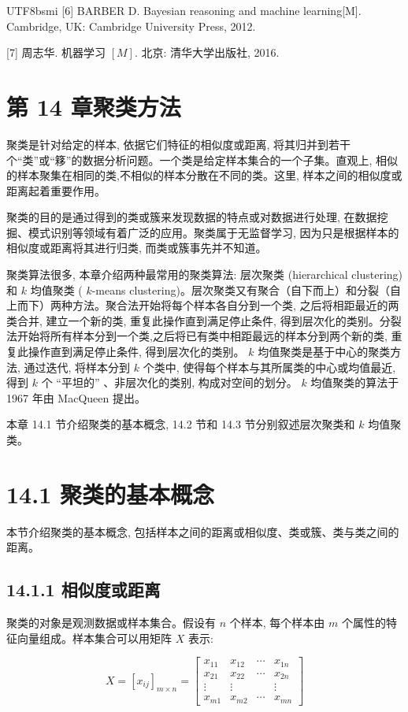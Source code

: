 \documentclass[10pt]{article}
\begin{document}
\begin{CJK*}{UTF8}{bsmi}
[6] BARBER D. Bayesian reasoning and machine learning[M]. Cambridge, UK: Cambridge University Press, 2012.

[7] 周志华. 机器学习 $[M]$. 北京: 清华大学出版社, 2016.

\section*{第 14 章聚类方法}
聚类是针对给定的样本, 依据它们特征的相似度或距离, 将其归并到若干个“类”或“簃”的数据分析问题。一个类是给定样本集合的一个子集。直观上, 相似的样本聚集在相同的类,不相似的样本分散在不同的类。这里, 样本之间的相似度或距离起着重要作用。

聚类的目的是通过得到的类或簇来发现数据的特点或对数据进行处理, 在数据挖掘、模式识别等领域有着广泛的应用。聚类属于无监督学习, 因为只是根据样本的相似度或距离将其进行归类, 而类或簇事先并不知道。

聚类算法很多, 本章介绍两种最常用的聚类算法: 层次聚类 (hierarchical clustering) 和 $k$ 均值聚类 ( $k$-means clustering)。层次聚类又有聚合（自下而上）和分裂（自上而下）两种方法。聚合法开始将每个样本各自分到一个类, 之后将相距最近的两类合并, 建立一个新的类, 重复此操作直到满足停止条件, 得到层次化的类别。分裂法开始将所有样本分到一个类,之后将已有类中相距最远的样本分到两个新的类, 重复此操作直到满足停止条件, 得到层次化的类别。 $k$ 均值聚类是基于中心的聚类方法, 通过迭代, 将样本分到 $k$ 个类中, 使得每个样本与其所属类的中心或均值最近, 得到 $k$ 个 “平坦的” 、非层次化的类别, 构成对空间的划分。 $k$ 均值聚类的算法于 1967 年由 MacQueen 提出。

本章 14.1 节介绍聚类的基本概念, 14.2 节和 14.3 节分别叙述层次聚类和 $k$ 均值聚类。

\section*{14.1 聚类的基本概念}
本节介绍聚类的基本概念, 包括样本之间的距离或相似度、类或簇、类与类之间的距离。

\subsection*{14.1.1 相似度或距离}
聚类的对象是观测数据或样本集合。假设有 $n$ 个样本, 每个样本由 $m$ 个属性的特征向量组成。样本集合可以用矩阵 $X$ 表示:

\[
X=\left[x_{i j}\right]_{m \times n}=\left[\begin{array}{cccc}
x_{11} & x_{12} & \cdots & x_{1 n}  \tag{14.1}\\
x_{21} & x_{22} & \cdots & x_{2 n} \\
\vdots & \vdots & & \vdots \\
x_{m 1} & x_{m 2} & \cdots & x_{m n}
\end{array}\right]
\]


\end{CJK*}
\end{document}
